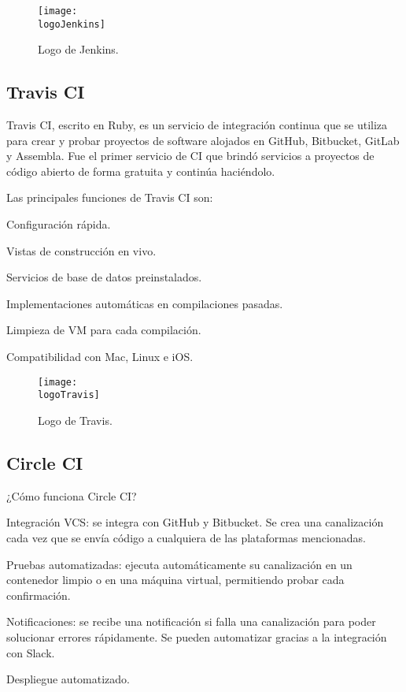 \begin{figure}[h]
    \centering
    \texttt{[image: \\logoJenkins]}
    \caption{Logo de Jenkins.}
\end{figure}

\subsection{Travis CI}
Travis CI, escrito en Ruby, es un servicio de integración continua que se utiliza para crear y probar proyectos de software alojados en GitHub, Bitbucket, GitLab y Assembla. Fue el primer servicio de CI que brindó servicios a proyectos de código abierto de forma gratuita y continúa haciéndolo.

Las principales funciones de Travis CI son:
\begin{compactitem}
    \item Configuración rápida.
    \item Vistas de construcción en vivo.
    \item Servicios de base de datos preinstalados.
    \item Implementaciones automáticas en compilaciones pasadas.
    \item Limpieza de VM para cada compilación.
    \item Compatibilidad con Mac, Linux e iOS.
\end{compactitem}

\begin{figure}[h]
    \centering
    \texttt{[image: \\logoTravis]}
    \caption{Logo de Travis.}
\end{figure}

\subsection{Circle CI}
¿Cómo funciona Circle CI?
\begin{compactitem}
    \item Integración VCS: se integra con GitHub y Bitbucket. Se crea una canalización cada vez que se envía código a cualquiera de las plataformas mencionadas.
    \item Pruebas automatizadas: ejecuta automáticamente su canalización en un contenedor limpio o en una máquina virtual, permitiendo probar cada confirmación.
    \item Notificaciones: se recibe una notificación si falla una canalización para poder solucionar errores rápidamente. Se pueden automatizar gracias a la integración con Slack.
    \item Despliegue automatizado.
\end{compactitem}

